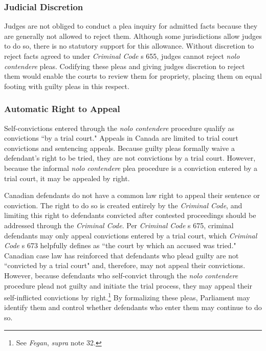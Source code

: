 \subsubsection{Judicial Discretion}

Judges are not obliged to conduct a plea inquiry for admitted facts because they are generally not allowed to reject them. Although some jurisdictions allow judges to do so, there is no statutory support for this allowance. Without discretion to reject facts agreed to under \textit{Criminal Code} s 655, judges cannot reject \textit{nolo contendere} pleas. Codifying these pleas and giving judges discretion to reject them would enable the courts to review them for propriety, placing them on equal footing with guilty pleas in this respect.

\subsubsection{Automatic Right to Appeal}

Self-convictions entered through the \textit{nolo contendere} procedure qualify as convictions ``by a trial court." Appeals in Canada are limited to trial court convictions and sentencing appeals. Because guilty pleas formally waive a defendant's right to be tried, they are not convictions by a trial court. However, because the informal \textit{nolo contendere} plea procedure is a conviction entered by a trial court, it may be appealed by right.

Canadian defendants do not have a common law right to appeal their sentence or conviction. The right to do so is created entirely by the \textit{Criminal Code}, and limiting this right to defendants convicted after contested proceedings should be addressed through the \textit{Criminal Code}. Per \textit{Criminal Code} s 675, criminal defendants may only appeal convictions entered by a trial court, which \textit{Criminal Code} s 673 helpfully defines as ``the court by which an accused was tried." Canadian case law has reinforced that defendants who plead guilty are not ``convicted by a trial court" and, therefore, may not appeal their convictions. However, because defendants who self-convict through the \textit{nolo contendere} procedure plead not guilty and initiate the trial process, they may appeal their self-inflicted convictions by right.\footnote{See \textit{Fegan}, \textit{supra} note 32.}  By formalizing these pleas, Parliament may identify them and control whether defendants who enter them may continue to do so.

